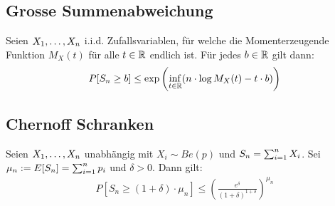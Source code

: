 \subsection*{Grosse Summenabweichung}
Seien $X_1, \dots, X_n$ i.i.d. Zufallsvariablen, für welche die
Momenterzeugende Funktion $M_X (t)$ für alle $t \in \mathbb{R}$ endlich ist. Für jedes
$b \in \mathbb{R}$ gilt dann:
\begin{align*}
  P[S_n \geq b] \leq \exp \left( \inf_{t \in \mathbb{R}}  ( n \cdot \log M_X (t) - t \cdot b ) \right)
\end{align*}
\subsection*{Chernoff Schranken}
Seien $X_1, \dots, X_n$ unabhängig mit $X_i \sim Be (p)$ und $S_n = \sum_{i = 1}^n X_i$.
Sei $\mu_n := E[S_n] = \sum_{i = 1}^n p_i$ und $\delta > 0$. Dann gilt:
\begin{align*}
  P[S_n \geq  (1 + \delta) \cdot \mu_n] \leq \left( \frac{e^\delta}{ (1+\delta)^{1 + \delta}} \right)^{\mu_n}
\end{align*}